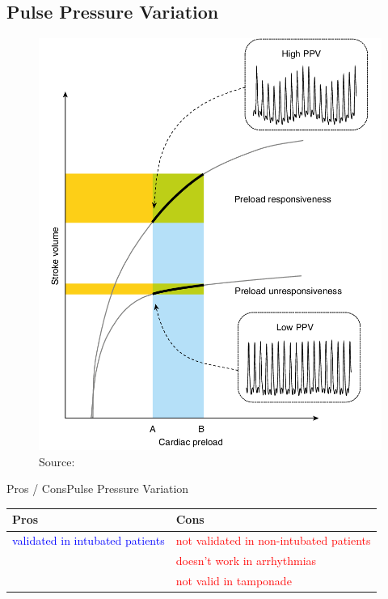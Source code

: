 \documentclass{beamer}
\newcommand{\pro}{\textcolor{blue}}
\newcommand{\con}{\textcolor{red}}
\begin{document}
		\subsection{Pulse Pressure Variation}
			\begin{frame}
				\begin{figure}
					\centering
					\includegraphics[height=0.90\textheight]{figures/ppv}
					\tiny Source: \cite{Teboul2019}
					\label{fig:ppv}
				\end{figure}
			\end{frame}
			\begin{frame}{Pros / Cons}{Pulse Pressure Variation}
				\begin{center}
					\begin{tabular}{l||l}
						\textbf{Pros} & \textbf{Cons} \\	
						\hline
						\pro{validated in intubated patients} & \con{not validated in non-intubated patients} \\
						\hline
						& \con{doesn't work in arrhythmias}\\
						\hline
						 & \con{not valid in tamponade}\\
					\end{tabular}
				\end{center} 
			\end{frame}
\end{document}
